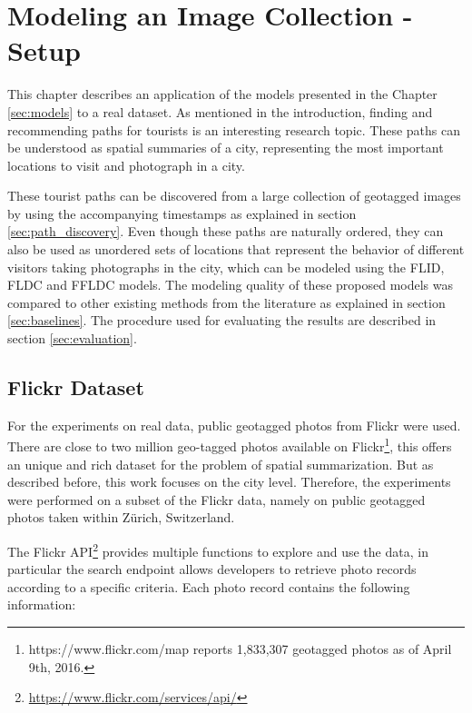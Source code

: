\chapter{Modeling an Image Collection - Setup}
\label{sec:experimental_setup}

This chapter describes an application of the models presented in the Chapter \ref{sec:models} to a real dataset. As mentioned in the introduction, finding and recommending paths for tourists is an interesting research topic. These paths can be understood as spatial summaries of a city, representing the most important locations to visit and photograph in a city.

These tourist paths can be discovered from a large collection of geotagged images by using the accompanying timestamps as explained in section \ref{sec:path_discovery}. Even though these paths are naturally ordered, they can also be used as unordered sets of locations that represent the behavior of different visitors taking photographs in the city, which can be modeled using the FLID, FLDC and FFLDC models. The modeling quality of these proposed models was compared to other existing methods from the literature as explained in section \ref{sec:baselines}. The procedure used for evaluating the results are described in section \ref{sec:evaluation}.

\section{Flickr Dataset}

For the experiments on real data, public geotagged photos from Flickr were used. There are close to two million geo-tagged photos available on Flickr\footnote{https://www.flickr.com/map reports 1,833,307 geotagged photos as of April 9th, 2016.}, this offers an unique and rich dataset for the problem of spatial summarization. But as described before, this work focuses on the city level. Therefore, the experiments were performed on a subset of the Flickr data, namely on public geotagged photos taken within Zürich, Switzerland.

The Flickr API\footnote{\url{https://www.flickr.com/services/api/}} provides multiple functions to explore and use the data, in particular the search endpoint allows developers to retrieve photo records according to a specific criteria. Each photo record contains the following information:


